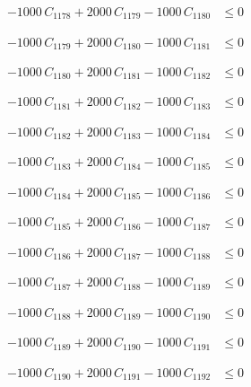 \documentclass[a4paper,11pt]{article}
\begin{document}
\begin{align}
-1000\,C_{1178} + 2000\,C_{1179} - 1000\,C_{1180} &\leq 0 \nonumber
\end{align}

\begin{align}
-1000\,C_{1179} + 2000\,C_{1180} - 1000\,C_{1181} &\leq 0 \nonumber
\end{align}

\begin{align}
-1000\,C_{1180} + 2000\,C_{1181} - 1000\,C_{1182} &\leq 0 \nonumber
\end{align}

\begin{align}
-1000\,C_{1181} + 2000\,C_{1182} - 1000\,C_{1183} &\leq 0 \nonumber
\end{align}

\begin{align}
-1000\,C_{1182} + 2000\,C_{1183} - 1000\,C_{1184} &\leq 0 \nonumber
\end{align}

\begin{align}
-1000\,C_{1183} + 2000\,C_{1184} - 1000\,C_{1185} &\leq 0 \nonumber
\end{align}

\begin{align}
-1000\,C_{1184} + 2000\,C_{1185} - 1000\,C_{1186} &\leq 0 \nonumber
\end{align}

\begin{align}
-1000\,C_{1185} + 2000\,C_{1186} - 1000\,C_{1187} &\leq 0 \nonumber
\end{align}

\begin{align}
-1000\,C_{1186} + 2000\,C_{1187} - 1000\,C_{1188} &\leq 0 \nonumber
\end{align}

\begin{align}
-1000\,C_{1187} + 2000\,C_{1188} - 1000\,C_{1189} &\leq 0 \nonumber
\end{align}

\begin{align}
-1000\,C_{1188} + 2000\,C_{1189} - 1000\,C_{1190} &\leq 0 \nonumber
\end{align}

\begin{align}
-1000\,C_{1189} + 2000\,C_{1190} - 1000\,C_{1191} &\leq 0 \nonumber
\end{align}

\begin{align}
-1000\,C_{1190} + 2000\,C_{1191} - 1000\,C_{1192} &\leq 0 \nonumber
\end{align}
\end{document}
